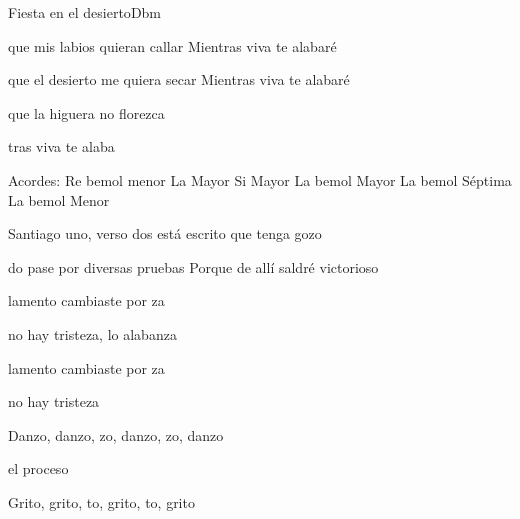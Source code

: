 \documentclass[12pt, spanish]{book}
\begin{document}
\begin{song}{Fiesta en el desierto}{Dbm}
\begin{SBOpGroup}
            que mis labios quieran callar
            Mientras viva te alabaré

            que el desierto me quiera secar
            Mientras viva te alabaré

            que la higuera no florezca

            tras viva te alaba
        \end{SBOpGroup}

        \ifChordBk
        \begin{SBOpGroup}
            Acordes:\break
            \upchord{\Dflatm}\qquad Re bemol menor  \hfill
            \upchord{\A}\qquad La Mayor \hfill\null\break
            \upchord{\B}\qquad\qquad Si Mayor \hfill
            \upchord{\Aflat}\qquad La bemol Mayor \hfill\null\break
            \upchord{\Aflatseven}\qquad La bemol S\'eptima \hfill
            \upchord{\Aflatm}\qquad La bemol Menor \hfill\null\break
        \end{SBOpGroup}
        \fi
        \begin{SBExtraKeys}{

            \begin{SBOpGroup}
                 Santiago uno, verso dos
                está escrito que tenga gozo

                do pase por diversas pruebas
                Porque de allí saldré victorioso
            \end{SBOpGroup}

            \begin{SBOpGroup}
                 lamento cambiaste por za

                 no hay tristeza, lo alabanza

                 lamento cambiaste por za

                 no hay tristeza
            \end{SBOpGroup}

            \begin{SBChorus}
                 Danzo, danzo, zo, danzo, zo, danzo

                 el proceso

                 Grito, grito, to, grito, to, grito


\end{SBChorus}}
\end{SBExtraKeys}
\end{song}
\end{document}
